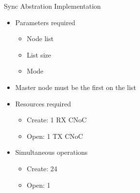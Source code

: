 		\begin{frame}[fragile]{Sync Abstration Implementation}
			\begin{itemize}
				\item Parameters required
				\begin{itemize}
					\item Node list
					\item List size
					\item Mode
				\end{itemize}
				\item Master node must be the first on the list
			\end{itemize}

			\begin{itemize}
				\item Resources required
				\begin{itemize}
					\item Create: 1 RX CNoC
					\item Open: 1 TX CNoC
				\end{itemize}
			\end{itemize}

			\begin{itemize}
				\item Simultaneous operations
				\begin{itemize}
					\item Create: 24
					\item Open: 1
				\end{itemize}
			\end{itemize}
		\end{frame}

